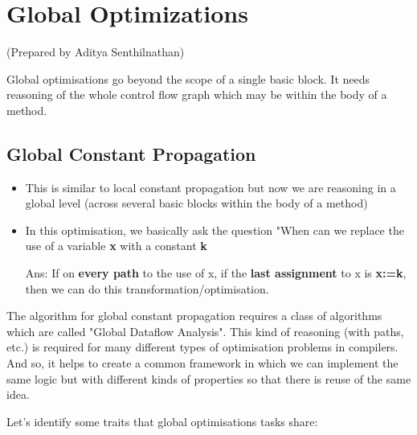 \section{Global Optimizations} 
\setlength{\parindent}{0pt}

(Prepared by Aditya Senthilnathan)

\vspace{0.3cm}

Global optimisations go beyond the scope of a single basic block. It needs reasoning of the whole control flow graph which may be within the body of a method.


\subsection{Global Constant Propagation}

\begin{itemize}
    \item This is similar to local constant propagation but now we are reasoning in a global level (across several basic blocks within the body of a method)
    \item In this optimisation, we basically ask the question "When can we replace the use of a variable \textbf{x} with a constant \textbf{k}
    
    Ans: If on \textbf{every path} to the use of x, if the \textbf{last assignment} to x is \textbf{x:=k}, then we can do this transformation/optimisation.
\end{itemize}


The algorithm for global constant propagation requires a class of algorithms which are called "Global Dataflow Analysis". This kind of reasoning (with paths, etc.) is required for many different types of optimisation problems in compilers. And so, it helps to create a common framework in which we can implement the same logic but with different kinds of properties so that there is reuse of the same idea.

Let's identify some traits that global optimisations tasks share:

